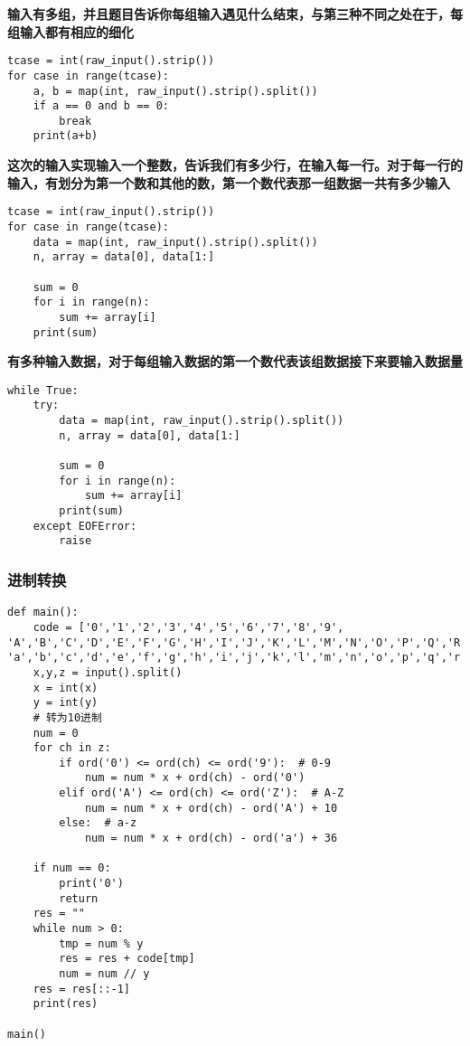 \textbf{输入有多组，并且题目告诉你每组输入遇见什么结束，与第三种不同之处在于，每组输入都有相应的细化}\\
\begin{lstlisting}
tcase = int(raw_input().strip())
for case in range(tcase):
	a, b = map(int, raw_input().strip().split())
	if a == 0 and b == 0:
		break
	print(a+b)
\end{lstlisting}

\textbf{这次的输入实现输入一个整数，告诉我们有多少行，在输入每一行。对于每一行的输入，有划分为第一个数和其他的数，第一个数代表那一组数据一共有多少输入}\\
\begin{lstlisting}
tcase = int(raw_input().strip())
for case in range(tcase):
	data = map(int, raw_input().strip().split())
	n, array = data[0], data[1:]

	sum = 0
	for i in range(n):
		sum += array[i]
	print(sum)
\end{lstlisting}

\textbf{有多种输入数据，对于每组输入数据的第一个数代表该组数据接下来要输入数据量}\\
\begin{lstlisting}
while True:
	try:
		data = map(int, raw_input().strip().split())
		n, array = data[0], data[1:]

		sum = 0
		for i in range(n):
			sum += array[i]
		print(sum)
	except EOFError:
		raise
\end{lstlisting}

\subsubsection{进制转换}
\begin{lstlisting}
def main():
	code = ['0','1','2','3','4','5','6','7','8','9',
'A','B','C','D','E','F','G','H','I','J','K','L','M','N','O','P','Q','R','S','T','U','V','W','X','Y','Z',
'a','b','c','d','e','f','g','h','i','j','k','l','m','n','o','p','q','r','s','t','u','v','w','x','y','z']
	x,y,z = input().split()
	x = int(x)
	y = int(y)
	# 转为10进制
	num = 0
	for ch in z:
		if ord('0') <= ord(ch) <= ord('9'):  # 0-9
			num = num * x + ord(ch) - ord('0')
		elif ord('A') <= ord(ch) <= ord('Z'):  # A-Z
			num = num * x + ord(ch) - ord('A') + 10
		else:  # a-z
			num = num * x + ord(ch) - ord('a') + 36

	if num == 0:
		print('0')
		return
	res = ""
	while num > 0:
		tmp = num % y
		res = res + code[tmp]
		num = num // y
	res = res[::-1]
	print(res)

main()
\end{lstlisting}


